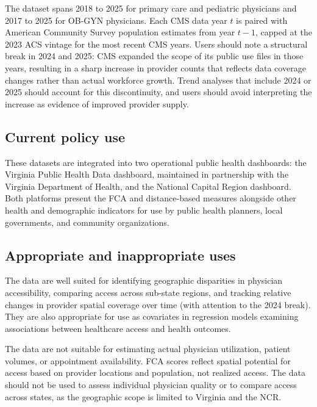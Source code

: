 \documentclass{CUP-JNL-DAP}%
\begin{document}
The dataset spans 2018 to 2025 for primary care and pediatric physicians and 2017 to 2025 for OB-GYN physicians. Each CMS data year $t$ is paired with American Community Survey population estimates from year $t-1$, capped at the 2023 ACS vintage for the most recent CMS years. Users should note a structural break in 2024 and 2025: CMS expanded the scope of its public use files in those years, resulting in a sharp increase in provider counts that reflects data coverage changes rather than actual workforce growth. Trend analyses that include 2024 or 2025 should account for this discontinuity, and users should avoid interpreting the increase as evidence of improved provider supply.

\subsection{Current policy use}

These datasets are integrated into two operational public health dashboards: the Virginia Public Health Data dashboard, maintained in partnership with the Virginia Department of Health, and the National Capital Region dashboard. Both platforms present the FCA and distance-based measures alongside other health and demographic indicators for use by public health planners, local governments, and community organizations.

\subsection{Appropriate and inappropriate uses}

The data are well suited for identifying geographic disparities in physician accessibility, comparing access across sub-state regions, and tracking relative changes in provider spatial coverage over time (with attention to the 2024 break). They are also appropriate for use as covariates in regression models examining associations between healthcare access and health outcomes.

The data are not suitable for estimating actual physician utilization, patient volumes, or appointment availability. FCA scores reflect spatial potential for access based on provider locations and population, not realized access. The data should not be used to assess individual physician quality or to compare access across states, as the geographic scope is limited to Virginia and the NCR.

\end{document}
